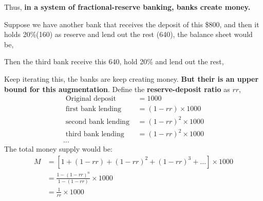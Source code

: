 \documentclass[12pt]{article}
\begin{document}
Thus, {\textbf {in a system of fractional-reserve banking, banks create money.}}





Suppose we have another bank that receives the deposit of this \$800, and then it
holds 20\%(160) as reserve and lend out the rest (640), the balance sheet would be,

\begin{figure}[H]
\end{figure}

Then the third bank receive this 640, hold 20\% and lend out the rest,

\begin{figure}[H]
\end{figure}

Keep iterating this, the banks are keep creating money. {\textbf {But their is an
upper bound for this augmentation}}. Define the {\textbf {reserve-deposit ratio}} as 
$ rr $,
\begin{align*}
\text{ Original deposit } &= 1000\\
\text{ first bank lending }  &= (1 - rr) \times 1000\\
\text{ second bank lending }  &= (1 - rr)^{2} \times 1000\\
\text{ third bank lending }  &= (1 - rr)^{2} \times 1000\\
...
\end{align*}
The total money supply would be:
\begin{align*}
M &= \left[ 1 + (1 - rr) + (1 - rr)^{2} + (1 - rr)^{3} + ... \right]  \times 1000\\
	&= \frac{1 - (1 - rr)^{n}}{1 - (1 - rr)}  \times 1000\\
	&= \frac{1}{rr} \times 1000
\end{align*}
\end{document}
